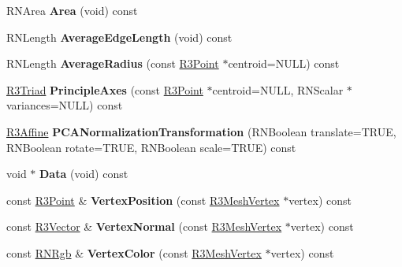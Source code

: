 \begin{DoxyCompactItemize}
\item 
R\+N\+Area {\bfseries Area} (void) const \hypertarget{class_r3_mesh_a1431bfda55f834837172b98acffe249d}{}\label{class_r3_mesh_a1431bfda55f834837172b98acffe249d}

\item 
R\+N\+Length {\bfseries Average\+Edge\+Length} (void) const \hypertarget{class_r3_mesh_a5001acde8b4b470dcb26823719b43267}{}\label{class_r3_mesh_a5001acde8b4b470dcb26823719b43267}

\item 
R\+N\+Length {\bfseries Average\+Radius} (const \hyperlink{class_r3_point}{R3\+Point} $\ast$centroid=N\+U\+LL) const \hypertarget{class_r3_mesh_ae0c01cea92f71dfaa918c5d082d5c2cc}{}\label{class_r3_mesh_ae0c01cea92f71dfaa918c5d082d5c2cc}

\item 
\hyperlink{class_r3_triad}{R3\+Triad} {\bfseries Principle\+Axes} (const \hyperlink{class_r3_point}{R3\+Point} $\ast$centroid=N\+U\+LL, R\+N\+Scalar $\ast$variances=N\+U\+LL) const \hypertarget{class_r3_mesh_a43e3f1234625c0b651925689c7e51199}{}\label{class_r3_mesh_a43e3f1234625c0b651925689c7e51199}

\item 
\hyperlink{class_r3_affine}{R3\+Affine} {\bfseries P\+C\+A\+Normalization\+Transformation} (R\+N\+Boolean translate=T\+R\+UE, R\+N\+Boolean rotate=T\+R\+UE, R\+N\+Boolean scale=T\+R\+UE) const \hypertarget{class_r3_mesh_a916cc4afe9c3c40474192ecaa18e230d}{}\label{class_r3_mesh_a916cc4afe9c3c40474192ecaa18e230d}

\item 
void $\ast$ {\bfseries Data} (void) const \hypertarget{class_r3_mesh_a3cda384864fe296ea74c06eea88c53a3}{}\label{class_r3_mesh_a3cda384864fe296ea74c06eea88c53a3}

\item 
const \hyperlink{class_r3_point}{R3\+Point} \& {\bfseries Vertex\+Position} (const \hyperlink{class_r3_mesh_vertex}{R3\+Mesh\+Vertex} $\ast$vertex) const \hypertarget{class_r3_mesh_a889925a27cf1b210c5503b1f772ff0b6}{}\label{class_r3_mesh_a889925a27cf1b210c5503b1f772ff0b6}

\item 
const \hyperlink{class_r3_vector}{R3\+Vector} \& {\bfseries Vertex\+Normal} (const \hyperlink{class_r3_mesh_vertex}{R3\+Mesh\+Vertex} $\ast$vertex) const \hypertarget{class_r3_mesh_a923b5dd1304148db8bfa4346dfbd9ca3}{}\label{class_r3_mesh_a923b5dd1304148db8bfa4346dfbd9ca3}

\item 
const \hyperlink{class_r_n_rgb}{R\+N\+Rgb} \& {\bfseries Vertex\+Color} (const \hyperlink{class_r3_mesh_vertex}{R3\+Mesh\+Vertex} $\ast$vertex) const \hypertarget{class_r3_mesh_a9a7adf91cfd0192c3e5ca50ebb0150e8}{}\label{class_r3_mesh_a9a7adf91cfd0192c3e5ca50ebb0150e8}


\end{DoxyCompactItemize}
